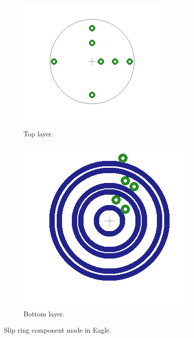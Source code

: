 \begin{figure}[h]
 \centering
 \begin{subfigure}{0.4\linewidth}
  \includegraphics[width=\linewidth]{img/slip_ring_top}
 \caption{Top layer.}
 \label{fig:slip_ring_top}
 \end{subfigure}
 \begin{subfigure}{0.4\linewidth}
  \includegraphics[width=\linewidth]{img/slip_ring_bot}
 \caption{Bottom layer.}
 \label{fig:slip_ring_bot}
 \end{subfigure}
 \caption{Slip ring component made in Eagle.}
 \label{fig:slip_ring_eagle}
\end{figure}

%     
